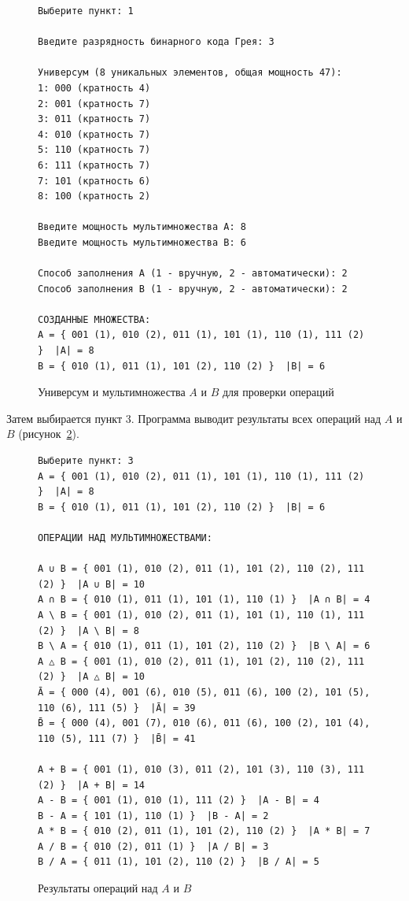 \documentclass[14pt,a4paper]{extreport}
\begin{document}
\begin{figure}[H]
\begin{lstlisting}[numbers=none,frame=single]
Выберите пункт: 1

Введите разрядность бинарного кода Грея: 3

Универсум (8 уникальных элементов, общая мощность 47):
1: 000 (кратность 4)
2: 001 (кратность 7)
3: 011 (кратность 7)
4: 010 (кратность 7)
5: 110 (кратность 7)
6: 111 (кратность 7)
7: 101 (кратность 6)
8: 100 (кратность 2)

Введите мощность мультимножества A: 8
Введите мощность мультимножества B: 6

Способ заполнения A (1 - вручную, 2 - автоматически): 2
Способ заполнения B (1 - вручную, 2 - автоматически): 2

СОЗДАННЫЕ МНОЖЕСТВА:
A = { 001 (1), 010 (2), 011 (1), 101 (1), 110 (1), 111 (2) }  |A| = 8
B = { 010 (1), 011 (1), 101 (2), 110 (2) }  |B| = 6
\end{lstlisting}
\caption{Универсум и мультимножества $A$ и $B$ для проверки операций}\label{fig:ops_u}
\end{figure}

Затем выбирается пункт 3. Программа выводит результаты всех операций над $A$ и $B$ (рисунок~\ref{fig:ops}).

\begin{figure}[H]
\begin{lstlisting}[numbers=none,frame=single]
Выберите пункт: 3
A = { 001 (1), 010 (2), 011 (1), 101 (1), 110 (1), 111 (2) }  |A| = 8
B = { 010 (1), 011 (1), 101 (2), 110 (2) }  |B| = 6

ОПЕРАЦИИ НАД МУЛЬТИМНОЖЕСТВАМИ:

A ∪ B = { 001 (1), 010 (2), 011 (1), 101 (2), 110 (2), 111 (2) }  |A ∪ B| = 10
A ∩ B = { 010 (1), 011 (1), 101 (1), 110 (1) }  |A ∩ B| = 4
A \ B = { 001 (1), 010 (2), 011 (1), 101 (1), 110 (1), 111 (2) }  |A \ B| = 8
B \ A = { 010 (1), 011 (1), 101 (2), 110 (2) }  |B \ A| = 6
A △ B = { 001 (1), 010 (2), 011 (1), 101 (2), 110 (2), 111 (2) }  |A △ B| = 10
Ā = { 000 (4), 001 (6), 010 (5), 011 (6), 100 (2), 101 (5), 110 (6), 111 (5) }  |Ā| = 39
B̄ = { 000 (4), 001 (7), 010 (6), 011 (6), 100 (2), 101 (4), 110 (5), 111 (7) }  |B̄| = 41

A + B = { 001 (1), 010 (3), 011 (2), 101 (3), 110 (3), 111 (2) }  |A + B| = 14
A - B = { 001 (1), 010 (1), 111 (2) }  |A - B| = 4
B - A = { 101 (1), 110 (1) }  |B - A| = 2
A * B = { 010 (2), 011 (1), 101 (2), 110 (2) }  |A * B| = 7
A / B = { 010 (2), 011 (1) }  |A / B| = 3
B / A = { 011 (1), 101 (2), 110 (2) }  |B / A| = 5
\end{lstlisting}
\caption{Результаты операций над $A$ и $B$}\label{fig:ops}
\end{figure}
\end{document}
